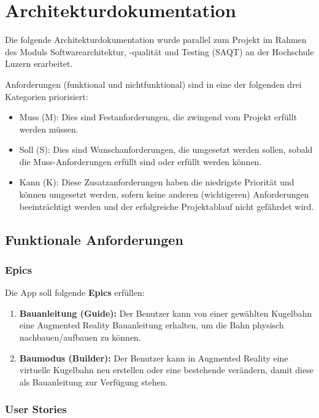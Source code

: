 \section{Architekturdokumentation}\label{appendix:architekturdokumentation}

Die folgende Architekturdokumentation wurde parallel zum Projekt im Rahmen des Moduls Softwarearchitektur, -qualität und Testing (SAQT) an der Hochschule Luzern erarbeitet.

Anforderungen (funktional und nichtfunktional) sind in eine der folgenden drei Kategorien priorisiert:
\begin{itemize}
	\item Muss (M): Dies sind Festanforderungen, die zwingend vom Projekt erfüllt werden müssen.
	\item Soll (S): Dies sind Wunschanforderungen, die umgesetzt werden sollen, sobald die Muss-Anforderungen erfüllt sind oder erfüllt werden können.
	\item Kann (K): Diese Zusatzanforderungen haben die niedrigste Priorität und können umgesetzt werden, sofern keine anderen (wichtigeren) Anforderungen beeinträchtigt werden und der erfolgreiche Projektablauf nicht gefährdet wird.
\end{itemize}

\subsection{Funktionale Anforderungen}\label{appendix:funktionale-anforderungen}
\subsubsection{Epics}
Die App soll folgende \textbf{Epics} erfüllen:
\begin{enumerate}
	\item \textbf{Bauanleitung (Guide):} Der Benutzer kann von einer gewählten Kugelbahn eine Augmented Reality Bauanleitung erhalten, um die Bahn physisch nachbauen/aufbauen zu können.
	\item \textbf{Baumodus (Builder):} Der Benutzer kann in Augmented Reality eine virtuelle Kugelbahn neu erstellen oder eine bestehende verändern, damit diese als Bauanleitung zur Verfügung stehen.
\end{enumerate}

\subsubsection{User Stories}\label{appendix:user-stories}


